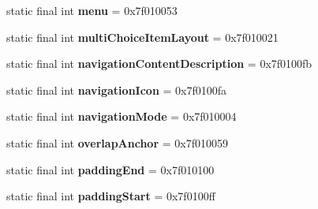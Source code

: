\begin{DoxyCompactItemize}
\item 
\hypertarget{classandroid_1_1support_1_1design_1_1_r_1_1attr_a0b206635c3ea3883eb3af84863d37584}{}static final int {\bfseries menu} = 0x7f010053\label{classandroid_1_1support_1_1design_1_1_r_1_1attr_a0b206635c3ea3883eb3af84863d37584}

\item 
\hypertarget{classandroid_1_1support_1_1design_1_1_r_1_1attr_abc4a87a62e1572b883a67aa399ffe35e}{}static final int {\bfseries multi\+Choice\+Item\+Layout} = 0x7f010021\label{classandroid_1_1support_1_1design_1_1_r_1_1attr_abc4a87a62e1572b883a67aa399ffe35e}

\item 
\hypertarget{classandroid_1_1support_1_1design_1_1_r_1_1attr_adaadd10648090e6b2f268643da9ec3c2}{}static final int {\bfseries navigation\+Content\+Description} = 0x7f0100fb\label{classandroid_1_1support_1_1design_1_1_r_1_1attr_adaadd10648090e6b2f268643da9ec3c2}

\item 
\hypertarget{classandroid_1_1support_1_1design_1_1_r_1_1attr_a03bf46fdb71dfdbac72b15e3efe275df}{}static final int {\bfseries navigation\+Icon} = 0x7f0100fa\label{classandroid_1_1support_1_1design_1_1_r_1_1attr_a03bf46fdb71dfdbac72b15e3efe275df}

\item 
\hypertarget{classandroid_1_1support_1_1design_1_1_r_1_1attr_a98ccf0c896c65512c88eaa5f71f6aa7c}{}static final int {\bfseries navigation\+Mode} = 0x7f010004\label{classandroid_1_1support_1_1design_1_1_r_1_1attr_a98ccf0c896c65512c88eaa5f71f6aa7c}

\item 
\hypertarget{classandroid_1_1support_1_1design_1_1_r_1_1attr_a38b3cd3ac2e4fc75a99b4c00c01d969e}{}static final int {\bfseries overlap\+Anchor} = 0x7f010059\label{classandroid_1_1support_1_1design_1_1_r_1_1attr_a38b3cd3ac2e4fc75a99b4c00c01d969e}

\item 
\hypertarget{classandroid_1_1support_1_1design_1_1_r_1_1attr_a92f0312d6082074b79517cc3af4cd8c5}{}static final int {\bfseries padding\+End} = 0x7f010100\label{classandroid_1_1support_1_1design_1_1_r_1_1attr_a92f0312d6082074b79517cc3af4cd8c5}

\item 
\hypertarget{classandroid_1_1support_1_1design_1_1_r_1_1attr_a9fbcc904b65b8e0195daa4225c751809}{}static final int {\bfseries padding\+Start} = 0x7f0100ff\label{classandroid_1_1support_1_1design_1_1_r_1_1attr_a9fbcc904b65b8e0195daa4225c751809}


\end{DoxyCompactItemize}
